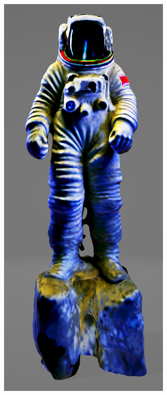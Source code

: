 \begin{figure}[ht]
    \centering
    \small
    \begin{subfigure}[b]{0.187\textwidth}
        \centering
        \includegraphics[width=\textwidth]{etc/Original/magic3D_astronaut.PNG}

\end{subfigure}
\end{figure}
